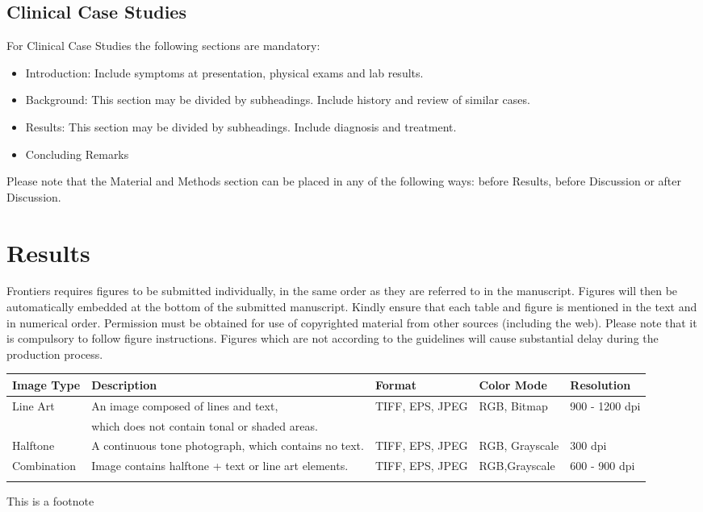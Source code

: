 \documentclass{frontiersENG} %
\begin{document}
\subsection{Clinical Case Studies}

For Clinical Case Studies the following sections are mandatory:

\begin{itemize}
\item Introduction: Include symptoms at presentation, physical exams and lab results.
\item Background: This section may be divided by subheadings. Include history and review of similar cases.
\item Results: This section may be divided by subheadings. Include diagnosis and treatment.
\item Concluding Remarks
\end{itemize}

Please note that the Material and Methods section can be placed in any of the following ways: before Results, before Discussion or after Discussion.




\section{Results}

Frontiers requires figures to be submitted individually, in the same order as they are referred to in the manuscript. Figures will then be automatically embedded at the bottom of the submitted manuscript. Kindly ensure that each table and figure is mentioned in the text and in numerical order. Permission must be obtained for use of copyrighted material from other sources (including the web). Please note that it is compulsory to follow figure instructions. Figures which are not according to the guidelines will cause substantial delay during the production process.

\begin{table}[!t]
{\begin{tabular}{lllll}\toprule
Image Type & Description & Format & Color Mode & Resolution\\\midrule
Line Art & An image composed of lines and text,  & TIFF, EPS, JPEG & RGB, Bitmap & 900 - 1200 dpi\\
           & which does not contain tonal or shaded areas.& & &\\
           Halftone & A continuous tone photograph, which contains no text. & TIFF, EPS, JPEG & RGB, Grayscale & 300 dpi\\
Combination & Image contains halftone + text or line art elements. & TIFF, EPS, JPEG & RGB,Grayscale & 600 - 900 dpi\\\botrule
\end{tabular}}{This is a footnote}
\end{table}
\end{document}
